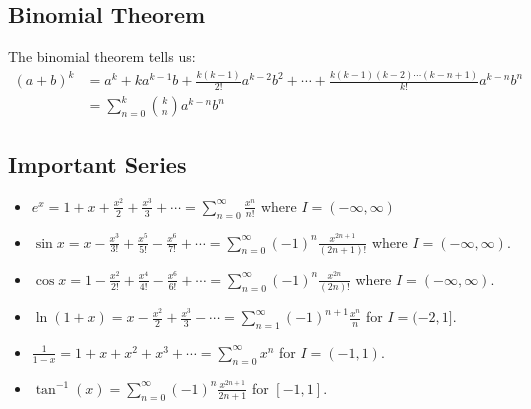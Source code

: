 \documentclass{article}
\begin{document}
        \subsection{Binomial Theorem}
        The binomial theorem tells us:
    \begin{align}
        (a+b)^k &= a^k + ka^{k-1}b + \frac{k(k-1)}{2!}a^{k-2}b^2 + \cdots + \frac{k(k-1)(k-2)\cdots (k-n+1)}{k!}a^{k-n}b^{n} \\ 
        &= \sum_{n=0}^k \binom{k}{n}a^{k-n}b^n
    \end{align}
    \subsection{Important Series}
    \begin{itemize}
        \item $e^x = 1 + x + \frac{x^2}{2} + \frac{x^3}{3} + \cdots = \sum_{n=0}^\infty \frac{x^n}{n!}$ where $I=(-\infty,\infty)$
        \item $\sin x = x - \frac{x^3}{3!} + \frac{x^5}{5!} - \frac{x^6}{7!} + \cdots = \sum_{n=0}^\infty (-1)^n \frac{x^{2n+1}}{(2n+1)!}$ where $I=(-\infty, \infty)$.
        \item $\cos x = 1 - \frac{x^2}{2!}+\frac{x^4}{4!} - \frac{x^6}{6!}+\cdots = \sum_{n=0}^\infty (-1)^n \frac{x^{2n}}{(2n)!}$ where $I=(-\infty, \infty)$.
        \item $\ln(1+x) =  x - \frac{x^2}{2} + \frac{x^3}{3} - \cdots = \sum_{n=1}^\infty (-1)^{n+1} \frac{x^n}{n}$ for $I=(-2,1]$.
        \item $\frac{1}{1-x}=1+x+x^2+x^3+\cdots = \sum_{n=0}^\infty x^n$ for $I=(-1,1)$.
        \item $\tan^{-1}(x) = \sum_{n=0}^\infty (-1)^n\frac{x^{2n+1}}{2n+1}$ for $[-1,1]$.
    \end{itemize}
    \newpage
\end{document}
